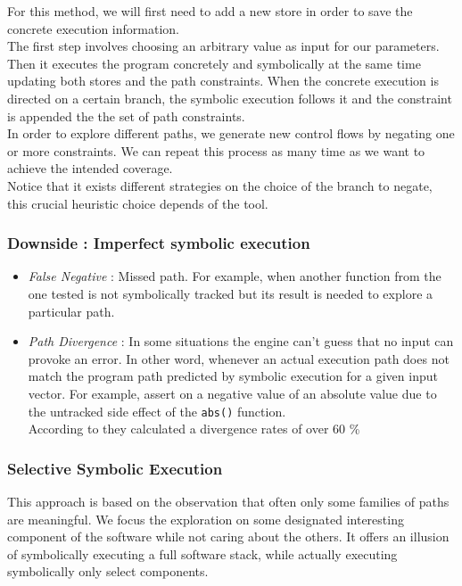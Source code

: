 \documentclass[11pt]{IEEEtran}
\begin{document}
    			For this method, we will first need to add a new store in order to save the concrete execution information.\\
    			The first step involves choosing an arbitrary value as input for our parameters. Then it executes the program concretely and symbolically at the same time updating both stores and the path constraints. When the concrete execution is directed on a certain branch, the symbolic execution follows it and the constraint is appended the the set of path constraints.\\
    			In order to explore different paths, we generate new control flows by negating one or more constraints. We can repeat this process as many time as we want to achieve the intended coverage.\\

    			Notice that it exists different strategies on the choice of the branch to negate, this crucial heuristic choice depends of the tool.\\

    		\subsubsection*{Downside : Imperfect symbolic execution}
    			\begin{itemize} %
    				\item \emph{False Negative} : Missed path. For example, when another function from the one tested is not symbolically tracked but its result is needed to explore a particular path.
    				\item \emph{Path Divergence} : In some situations the engine can't guess that no input can provoke an error. In other word, whenever an actual execution path does not match the program path predicted by symbolic execution for a given input vector. For example, assert on a negative value of an absolute value due to the untracked side effect of the \texttt{abs()} function.\\
    				According to \cite{Godefroid2008AutomatedWF} they calculated a divergence rates of over 60 \%
    			\end{itemize}

    	\subsubsection{Selective Symbolic Execution}
    	\label{subsec:selectiveSymbolicExec}
    		This approach is based on the observation that often only some families of paths are meaningful\cite{chipounov2012s2e}. We focus the exploration on some designated interesting component of the software while not caring about the others. It offers an illusion of symbolically executing a full software stack, while actually executing symbolically only select components.\\
\end{document}
